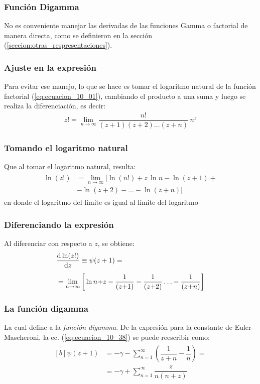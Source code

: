 \documentclass[12pt]{beamer}
\begin{document}
\begin{frame}
\frametitle{Función Digamma}
No es conveniente manejar las derivadas de las funciones Gamma o factorial de manera directa, como se definieron en la sección (\ref{seccion:otras_respresentaciones}).
\end{frame}
\begin{frame}
\frametitle{Ajuste en la expresión}
Para evitar ese manejo, lo que se hace es tomar el logaritmo natural de la función factorial (\ref{eq:ecuacion_10_01}), cambiando el producto a una suma y luego se realiza la diferenciación, es decir:
\pause
\begin{align}
z! = \lim_{n \to \infty} \dfrac{n!}{(z + 1)(z + 2) \ldots (z + n)} \, n^{z}
\label{eq:ecuacion_10_36}
\end{align}
\end{frame}
\begin{frame}
\frametitle{Tomando el logaritmo natural}
Que al tomar el logaritmo natural, resulta:
\pause
\begin{align}
\begin{aligned}
\ln (z!) &= \lim_{n \to \infty} \big[ \ln (n!) + z \, \ln n - \ln (z + 1) + \\[0.5em]
&- \ln (z + 2) - \ldots - \ln (z + n) \big]
\end{aligned}
\label{eq:ecuacion_10_37}
\end{align}
en donde el logaritmo del límite es igual al límite del logaritmo
\end{frame}
\begin{frame}
\frametitle{Diferenciando la expresión}
Al diferenciar con respecto a $z$, se obtiene:
\pause
\begin{align}
\begin{aligned}[b]
&\dv{\ln (z!)}{z} \equiv \psi(z + 1) = \\[0.5em]
&=\lim_{n \to \infty} \bigg[ \ln n {+} z - \dfrac{1}{(z {+} 1)} - \dfrac{1}{(z {+} 2)} \ldots - \dfrac{1}{(z {+} n)} \bigg]
\end{aligned}
\label{eq:ecuacion_10_38}
\end{align}
\end{frame}
\begin{frame}
\frametitle{La función digamma}
La cual define a la \emph{función digamma}. De la expresión para la constante de Euler-Mascheroni, la ec. (\ref{eq:ecuacion_10_38}) se puede reescribir como:
\pause
\begin{align}
\begin{aligned}[b]
\psi (z + 1) &= - \gamma - \sum_{n=1}^{\infty} \left( \dfrac{1}{z + n} - \dfrac{1}{n} \right) = \\[0.5em]
&= -\gamma + \sum_{n=1}^{\infty} \dfrac{z}{n (n + z)}
\end{aligned}
\label{eq:ecuacion_10_39}
\end{align}
\end{frame}
\end{document}
